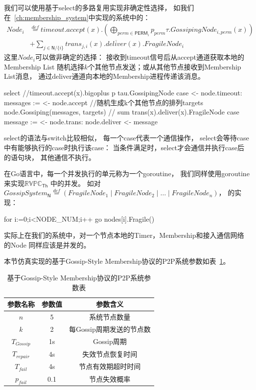 我们可以使用基于select的多路复用实现非确定性选择，
如我们在~\ref{ch:membership_system}中实现的系统中的：
\begin{align*}
   Node_i&\stackrel{def}{=}timeout.accept(x).(\bigoplus_{perm\in \mathsf{PERM}_i} p_{perm}\tau.GossipingNode_{i,perm}(x))\\
     &+\sum_{j\in \mathsf{N}/\{i\}}trans_{j,i}(x).\overline{deliver}(x).FragileNode_i
\end{align*}
这里$Node_i$可以做非确定的选择：
接收到timeout信号后从accept通道获取本地的Membership List
随机选择$k$个其他节点发送；或从其他节点接收到Membership List消息，
通过deliver通道向本地的Membership进程传递该消息。

\begin{codeblock}[language=GO]
   select {
      //timeout.accept(x).bigoplus p tau.GossipingNode
      case <- node.timeout:
         messages := <- node.accept
         //随机生成k个其他节点的排列targets
         node.Gossiping(messages, targets)
      // sum trans(x).deliver(x).FragileNode
      case message := <- node.trans:
         node.deliver <- message
	}
\end{codeblock}
select的语法与switch比较相似，
每一个case代表一个通信操作，
select会等待case中有能够执行的case时执行该case：
当条件满足时，select才会通信并执行case后的语句块，
其他通信不执行。

在Go语言中，每一个并发执行的单元称为一个goroutine，
我们同样使用goroutine来实现$\mathbb{RVPC}_{\mathsf{Th}}$
中的并发。
如对$GossipSystem_\mathsf{N}\stackrel{def}{=}(FragileNode_1\mid FragileNode_2\mid \dots \mid FragileNode_n)$，
的实现：
\begin{codeblock}[language=GO]
   for i:=0;i<NODE_NUM;i++ {
        go nodes[i].Fragile()
    }
\end{codeblock}
实际上在我们的系统中，对一个节点本地的Timer，Membership和接入通信网络的Node
同样应该是并发的。

本节仿真实现的基于Gossip-Style Membership协议的P2P系统参数如表~\ref{tab:param}。
\begin{table}[!hpt]
   \caption{基于Gossip-Style Membership协议的P2P系统参数表}
   \label{tab:param}
   \centering
   \begin{tabular}{@{}ccc@{}} \toprule
     参数名称 & 参数值 & 参数含义 \\ \midrule
     $n$ & 5 & 系统节点数量\\
     $k$ & 2 & 每Gossip周期发送的节点数\\
     $T_{Gossip}$ & 1s & Gossip周期\\
     $T_{repair}$ & 4s & 失效节点恢复时间\\
     $T_{fail}$ & 4s & 节点有效期超时时间\\
     $p_{fail}$ & 0.1 & 节点失效概率\\ \bottomrule
   \end{tabular}
 \end{table}

